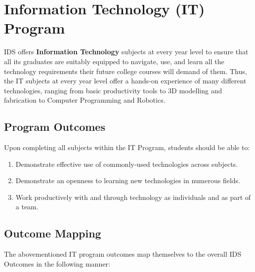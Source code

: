 \section{Information Technology (IT) Program}
IDS offers \textbf{Information Technology} subjects at every year level to ensure that all its graduates are suitably equipped to navigate, use, and learn all the technology requirements their future college courses will demand of them. Thus, the IT subjects at every year level offer a hands-on experience of many different technologies, ranging from basic productivity tools to 3D modelling and fabrication to Computer Programming and Robotics.

\subsection{Program Outcomes}
Upon completing all subjects within the IT Program, students should be able to:
\begin{enumerate}[label=PO\arabic{enumi}., leftmargin=5em]
	\item{Demonstrate effective use of commonly-used technologies across subjects.}
	\item{Demonstrate an openness to learning new technologies in numerous fields.}
	\item{Work productively with and through technology as individuals and as part of a team.}
\end{enumerate}

\subsection{Outcome Mapping}
The abovementioned IT program outcomes map themselves to the overall IDS Outcomes in the following manner:

